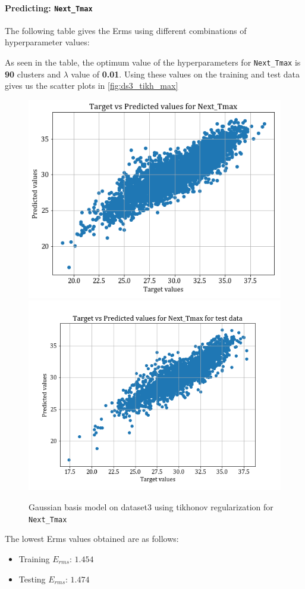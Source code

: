 \documentclass[12pt,a4paper]{article}
\def\tt#1{\texttt{#1}}
\begin{document}
\paragraph{Predicting: \tt{Next\_Tmax}}
The following table gives the Erms using different combinations of hyperparameter values:


As seen in the table, the optimum value of the hyperparameters for  \tt{Next\_Tmax} is \textbf{90} clusters and $\lambda$ value of \textbf{0.01}. Using these values on the training and test data gives us the scatter plots in \autoref{fig:ds3_tikh_max}
\begin{figure}
    \centering
    \includegraphics[scale=0.4]{images/train_ds3_tikh_max.png}
    \includegraphics[scale=0.4]{images/test_ds3_tikh_max.png}

    \caption{Gaussian basis model on dataset3 using tikhonov regularization for \tt{Next\_Tmax}}
    \label{fig:ds3_tikh_max}
\end{figure}
The lowest Erms values obtained are as follows:
\begin{itemize}
    \itemsep0em
    \item Training $E_{rms}$: $1.454$
    \item Testing $E_{rms}$: $1.474$
\end{itemize}
\end{document}
